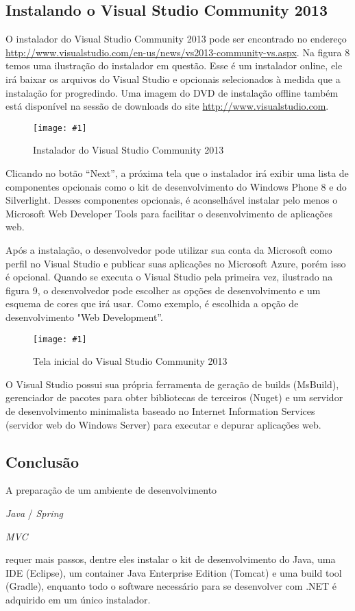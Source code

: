 \documentclass[a4paper,12pt]{article}
\newcommand{\spring} {
	\lang{Java}/\est{Spring} \sigla{MVC}
}
\newcommand{\figura}[2] {
	\begin{figure}[H]
		\centering
		\texttt{[image: \#1]}
		\caption{#2}
	\end{figure}
	\FloatBarrier
}
\newcommand{\est}[1] {
	\textit{#1}
}
\newcommand{\sigla}[1] {
	\textit{#1}
}
\newcommand{\lang}[1] {
	\textit{#1}
}
\begin{document}
\subsection{Instalando o Visual Studio Community 2013} 

O instalador do Visual Studio Community 2013 pode ser encontrado no endereço \url{http://www.visualstudio.com/en-us/news/vs2013-community-vs.aspx}. Na figura 8 temos uma ilustração do instalador em questão. Esse é um instalador online, ele irá baixar os arquivos do Visual Studio e opcionais selecionados à medida que a instalação for progredindo. Uma imagem do DVD de instalação offline também está disponível na sessão de downloads do site \url{http://www.visualstudio.com}.

\figura{vs1.png}{Instalador do Visual Studio Community 2013}

Clicando no botão “Next”, a próxima tela que o instalador irá exibir uma lista de componentes opcionais como o kit de desenvolvimento do Windows Phone 8 e do Silverlight. Desses componentes opcionais, é aconselhável instalar pelo menos o Microsoft Web Developer Tools para facilitar o desenvolvimento de aplicações web.

Após a instalação, o desenvolvedor pode utilizar sua conta da Microsoft como perfil no Visual Studio e publicar suas aplicações no Microsoft Azure, porém isso é opcional. Quando se executa o Visual Studio pela primeira vez, ilustrado na figura 9, o desenvolvedor pode escolher as opções de desenvolvimento e um esquema de cores que irá usar. Como exemplo, é escolhida a opção de desenvolvimento "Web Development”.

\figura{vs2.png}{Tela inicial do Visual Studio Community 2013}

O Visual Studio possui sua própria ferramenta de geração de builds (MsBuild), gerenciador de pacotes para obter bibliotecas de terceiros (Nuget) e um servidor de desenvolvimento minimalista baseado no Internet Information Services (servidor web do Windows Server) para executar e depurar aplicações web.  

\subsection{Conclusão}

A preparação de um ambiente de desenvolvimento \spring requer mais passos, dentre eles instalar o kit de desenvolvimento do Java, uma IDE (Eclipse), um container Java Enterprise Edition (Tomcat) e uma build tool (Gradle), enquanto  todo o software necessário para se desenvolver com .NET é adquirido em um único instalador.
\end{document}
